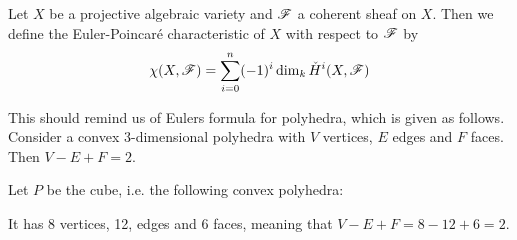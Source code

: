 \begin{definition}
Let $X$ be a projective algebraic variety and $\mathscr{F}$ a coherent sheaf on $X$. Then we define the Euler-Poincaré characteristic of $X$ with respect to $\mathscr{F}$ by 
\begin{equation*}
    \chi(X,\mathscr{F}) = \sum_{i=0}^n (-1)^i \dim_k \check{H}^i(X,\mathscr{F})
\end{equation*}
\end{definition}

This should remind us of Eulers formula for polyhedra, which is given as follows. Consider a convex 3-dimensional polyhedra with $V$ vertices, $E$ edges and $F$ faces. Then $V-E+F = 2$. 

\begin{example}
Let $P$ be the cube, i.e. the following convex polyhedra:
\begin{center}
\def\svgwidth{0.4\textwidth}

\end{center}
It has 8 vertices, 12, edges and 6 faces, meaning that $V-E+F = 8-12+6 = 2$.  
\end{example}


